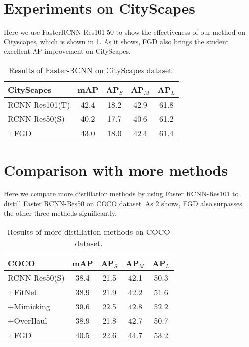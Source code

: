 \documentclass[10pt,twocolumn,letterpaper]{article}
\begin{document}
\section{Experiments on CityScapes}
Here we use FasterRCNN Res101-50 to show the effectiveness of our method on Cityscapes\cite{cordts2016cityscapes}, which is shown in \cref{table:city results}. As it shows, FGD also brings the student excellent AP improvement on CityScapes.
\begin{table}
  \centering
  \begin{tabular}{l|cccc}
    \toprule
    {\bf CityScapes} & mAP & AP$_{S}$ & AP$_{M}$ & AP$_{L}$\\
    \midrule
    RCNN-Res101(T) & 42.4 &18.2&42.9&61.8\\
    RCNN-Res50(S) & 40.2 &17.7&40.6&61.2\\
    +FGD & 43.0&18.0&42.4&61.4 \\
    \bottomrule
  \end{tabular}
\caption{Results of Faster-RCNN on CityScapes dataset.}
 \label{table:city results}
\end{table}

\section{Comparison with more methods}
Here we compare more distillation methods\cite{romero2014fitnets,li2017mimicking,heo2019comprehensive} by using Faster RCNN-Res101 to distill Faster RCNN-Res50 on COCO dataset. As \cref{table:more methods} shows, FGD also surpasses the other three methods significantly.

\begin{table}
  \centering
  \begin{tabular}{l|cccc}
    \toprule
    {\bf COCO} & mAP & AP$_{S}$ & AP$_{M}$ & AP$_{L}$\\
    \midrule
    RCNN-Res50(S) & 38.4 &21.5&42.1&50.3\\
    +FitNet\cite{romero2014fitnets} &38.9 &21.9&42.2&51.6\\
    +Mimicking\cite{li2017mimicking} &39.6 &22.5&42.8&52.2\\
    +OverHaul\cite{heo2019comprehensive} &38.9 &21.8&42.7&50.7\\
    +FGD & 40.5&22.6&44.7&53.2 \\
    \bottomrule
  \end{tabular}
\caption{Results of more distillation methods on COCO dataset.}
 \label{table:more methods}
\end{table}
\end{document}
